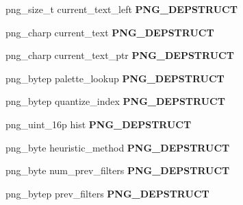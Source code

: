 \begin{DoxyCompactItemize}
\item 
png\+\_\+size\+\_\+t current\+\_\+text\+\_\+left {\bfseries P\+N\+G\+\_\+\+D\+E\+P\+S\+T\+R\+U\+CT}\hypertarget{structpng__struct__def_afa122f78bdbc0e667d6ec985ee88773a}{}\label{structpng__struct__def_afa122f78bdbc0e667d6ec985ee88773a}

\item 
png\+\_\+charp current\+\_\+text {\bfseries P\+N\+G\+\_\+\+D\+E\+P\+S\+T\+R\+U\+CT}\hypertarget{structpng__struct__def_aad598485fd88cf6566e5c50b41569264}{}\label{structpng__struct__def_aad598485fd88cf6566e5c50b41569264}

\item 
png\+\_\+charp current\+\_\+text\+\_\+ptr {\bfseries P\+N\+G\+\_\+\+D\+E\+P\+S\+T\+R\+U\+CT}\hypertarget{structpng__struct__def_a34c10435db21021710c978fece933558}{}\label{structpng__struct__def_a34c10435db21021710c978fece933558}

\item 
png\+\_\+bytep palette\+\_\+lookup {\bfseries P\+N\+G\+\_\+\+D\+E\+P\+S\+T\+R\+U\+CT}\hypertarget{structpng__struct__def_a390c42657e62830cefa511d36ffdc74a}{}\label{structpng__struct__def_a390c42657e62830cefa511d36ffdc74a}

\item 
png\+\_\+bytep quantize\+\_\+index {\bfseries P\+N\+G\+\_\+\+D\+E\+P\+S\+T\+R\+U\+CT}\hypertarget{structpng__struct__def_a4eefc11eab20161c36a91fe5677a7d9c}{}\label{structpng__struct__def_a4eefc11eab20161c36a91fe5677a7d9c}

\item 
png\+\_\+uint\+\_\+16p hist {\bfseries P\+N\+G\+\_\+\+D\+E\+P\+S\+T\+R\+U\+CT}\hypertarget{structpng__struct__def_addaabec246c4e7b0f355006da530052d}{}\label{structpng__struct__def_addaabec246c4e7b0f355006da530052d}

\item 
png\+\_\+byte heuristic\+\_\+method {\bfseries P\+N\+G\+\_\+\+D\+E\+P\+S\+T\+R\+U\+CT}\hypertarget{structpng__struct__def_a24f89c454fa60d40ab0d7cc1c58f26a3}{}\label{structpng__struct__def_a24f89c454fa60d40ab0d7cc1c58f26a3}

\item 
png\+\_\+byte num\+\_\+prev\+\_\+filters {\bfseries P\+N\+G\+\_\+\+D\+E\+P\+S\+T\+R\+U\+CT}\hypertarget{structpng__struct__def_a9a2f5af3f598c020498c5cbab10946d7}{}\label{structpng__struct__def_a9a2f5af3f598c020498c5cbab10946d7}

\item 
png\+\_\+bytep prev\+\_\+filters {\bfseries P\+N\+G\+\_\+\+D\+E\+P\+S\+T\+R\+U\+CT}\hypertarget{structpng__struct__def_a5d09ad981d9676b130d410123fe51978}{}\label{structpng__struct__def_a5d09ad981d9676b130d410123fe51978}


\end{DoxyCompactItemize}
